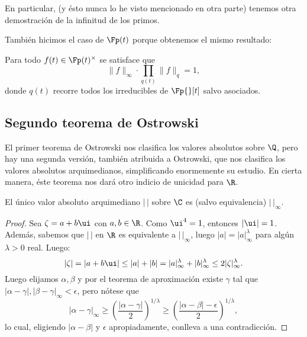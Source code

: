 \documentclass[teoria-numeros.tex]{subfiles}
\begin{document}
En particular, (y ésto nunca lo he visto mencionado en otra parte) tenemos otra demostración de la infinitud de los primos.

También hicimos el caso de $\Fp(t)$ porque obtenemos el mismo resultado:
\begin{prop}
	Para todo $f(t) \in \Fp(t)^\times$ se satisface que
	$$ \|f\|_\infty \cdot \prod_{q(t)} \|f\|_q = 1, $$
	donde $q(t)$ recorre todos los irreducibles de $\Fp{}[t]$ salvo asociados.
\end{prop}

\subsection{Segundo teorema de Ostrowski}
El primer teorema de Ostrowski nos clasifica los valores absolutos sobre $\Q$, pero hay una segunda versión, también atribuida a Ostrowski,
que nos clasifica los valores absolutos arquimedianos, simplificando enormemente su estudio.
En cierta manera, éste teorema nos dará otro indicio de unicidad para $\R$.

\begin{lem}
	El único valor absoluto arquimediano $|\,|$ sobre $\C$ es (salvo equivalencia) $|\,|_\infty$.
\end{lem}
\begin{proof}
	Sea $\zeta = a + b\ui$ con $a, b \in \R$.
	Como $\ui^4 = 1$, entonces $|\ui| = 1$.
	Además, sabemos que $|\,|$ en $\R$ es equivalente a $|\,|_\infty$, luego $|a| = |a|_\infty^\lambda$ para algún $\lambda > 0$ real.
	Luego:
	$$ |\zeta| = |a + b\ui| \le |a| + |b| = |a|_\infty^\lambda + |b|_\infty^\lambda \le 2|\zeta|_\infty^\lambda. $$
	Luego elijamos $\alpha, \beta$ y por el teorema de aproximación existe $\gamma$ tal que $|\alpha - \gamma|, |\beta - \gamma|_\infty < \epsilon$,
	pero nótese que
	$$ |\alpha - \gamma|_\infty \ge \left( \frac{|\alpha - \gamma|}{2} \right)^{1/\lambda}
	\ge \left( \frac{|\alpha - \beta| - \epsilon}{2} \right)^{1/\lambda}, $$
	lo cual, eligiendo $|\alpha - \beta|$ y $\epsilon$ apropiadamente, conlleva a una contradicción.
\end{proof}
\end{document}
